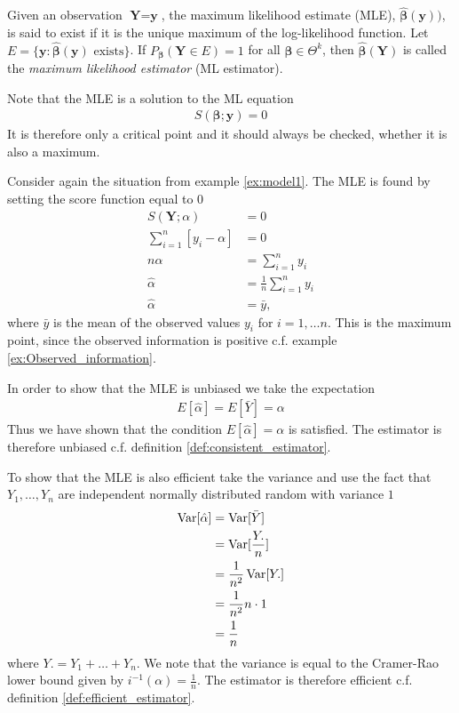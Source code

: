 \begin{definition} 
\label{def:MLE}
Given an observation $\textbf{Y}=\textbf{y}$, the maximum likelihood estimate (MLE), $\hat{\boldsymbol{\beta}}(\textbf{y}))$, is said to exist if it is the unique maximum of the log-likelihood function. 
Let $E = \{ \textbf{y} : \hat{\boldsymbol{\beta}}(\textbf{y}) \text{ exists} \}$. If $P_{\boldsymbol{\beta}}(\textbf{Y} \in E) = 1$ for all $\boldsymbol{\beta} \in \Theta^k$, then $\hat{\boldsymbol{\beta}}(\textbf{Y})$ is called the \textit{maximum likelihood estimator} (ML estimator).
\end{definition}
Note that the MLE is a solution to the ML equation
\begin{align*}
    S(\boldsymbol{\beta}; \textbf{y}) = 0
\end{align*}
It is therefore only a critical point and it should always be checked, whether it is also a maximum. 

\begin{example}
Consider again the situation from example \ref{ex:model1}. The MLE is found by setting the score function equal to $0$
\begin{align*}
    S\left(\textbf{Y}; \alpha \right) &= 0\\
    \sum_{i=1}^n \left[y_i - \alpha \right]&= 0\\
    n\alpha &= \sum_{i=1}^n y_i\\
    \hat{\alpha} &= \frac{1}{n} \sum_{i=1}^n y_i \\
    \hat{\alpha} &= \bar{y},
\end{align*}
where $\bar{y}$ is the mean of the observed values $y_i$ for $i = 1, \ldots n$. This is the maximum point, since the observed information is positive c.f. example  \ref{ex:Observed_information}.

In order to show that the MLE is unbiased we take the expectation
\begin{align*}
    E[\hat{\alpha}]=E[\bar{Y}]=\alpha
\end{align*}
Thus we have shown that the condition $E[\hat{\alpha}] = \alpha$ is satisfied. The estimator is therefore unbiased c.f. definition \ref{def:consistent_estimator}.

To show that the MLE is also efficient take the variance and use the fact that $Y_1,\ldots,Y_n$ are independent normally distributed random with variance $1$
\begin{align*}
\operatorname{\text{Var}}[\hat{\alpha}]&=\operatorname{\text{Var}}[\bar{Y}] \\
&=\operatorname{\text{Var}}[\frac{Y.}{n}] \\
&=\frac{1}{n^2}\operatorname{\text{Var}}[Y.] \\
&= \frac{1}{n^2}n \cdot 1 \\
&= \frac{1}{n}
\end{align*}
where $Y.=Y_1 + \ldots + Y_n$.
We note that the variance is equal to the Cramer-Rao lower bound given by $i^{-1}(\alpha)=\frac{1}{n}$. The estimator is therefore efficient c.f. definition \ref{def:efficient_estimator}.
\end{example}

